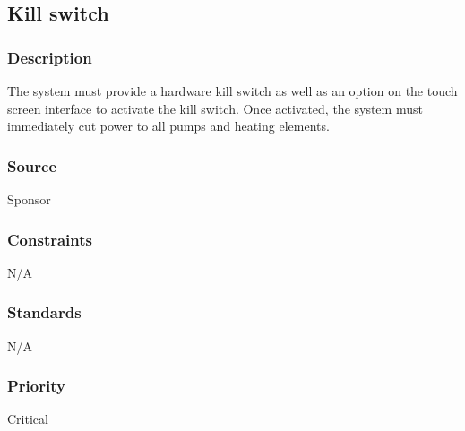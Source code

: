 \subsection{Kill switch}
\subsubsection{Description}
The system must provide a hardware kill switch as well as an option on the touch screen interface to activate the kill switch. Once activated, the system must immediately cut power to all pumps and heating elements.

\subsubsection{Source}
Sponsor

\subsubsection{Constraints}
N/A

\subsubsection{Standards}
N/A

\subsubsection{Priority}
Critical
